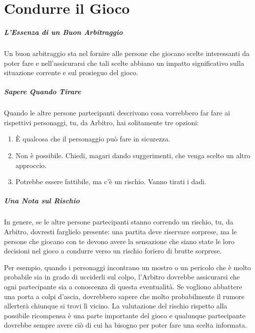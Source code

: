 \documentclass[itdr]{subfiles}
\begin{document}

\chapter{Condurre il Gioco}
\label{ch:condurre_il_gioco}

\paragraph{L’Essenza di un Buon Arbitraggio}
Un buon arbitraggio sta nel fornire alle persone che giocano scelte interessanti da poter fare e nell’assicurarsi che tali scelte abbiano un impatto significativo sulla situazione corrente e sul prosieguo del gioco.

\vfill

\paragraph{Sapere Quando Tirare}
Quando le altre persone partecipanti descrivono cosa vorrebbero far fare ai rispettivi personaggi, tu, da Arbitro, hai solitamente tre opzioni:
\begin{enumerate}
	\item È qualcosa che il personaggio può fare in sicurezza.
	\item Non è possibile. Chiedi, \mbox{magari} dando suggerimenti, che venga scelto un altro approccio. 
	\item Potrebbe essere fattibile, ma c’è un rischio. Vanno tirati i dadi.
\end{enumerate}

\vfill

\paragraph{Una Nota sul Rischio}
In genere, se le altre persone partecipanti stanno correndo un rischio, tu, da Arbitro, dovresti farglielo presente: una partita deve riservare sorprese, ma le persone che giocano con te devono avere la sensazione che siano state le loro decisioni nel gioco a condurre verso un rischio foriero di brutte sorprese.

Per esempio, quando i personaggi incontrano un mostro o un pericolo che è molto probabile sia in grado di ucciderli sul colpo, l’Arbitro dovrebbe assicurarsi che ogni partecipante sia a conoscenza di questa eventualità. Se vogliono abbattere una porta a colpi d’ascia, dovrebbero sapere che molto probabilmente il rumore allerterà chiunque si trovi lì vicino. La valutazione del rischio rispetto alla possibile ricompensa è una parte importante del gioco e qualunque partecipante dovrebbe sempre avere ciò di cui ha bisogno per poter fare una scelta informata.
\end{document}
